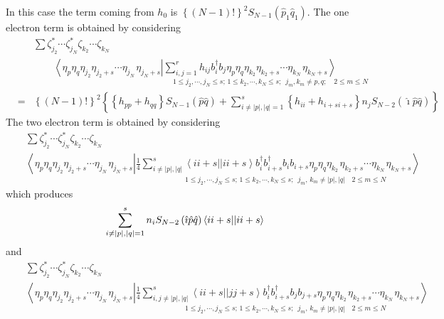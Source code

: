 In this case the term coming from $h_{0}$ is $\left\{ \left( N-1\right)
!\right\} ^{2}S_{N-1}\left( \hat{p}_{1}\hat{q}_{1}\right) $. The one
electron term is obtained by considering 
\begin{eqnarray}
&&\sum \zeta _{j_{2}}^{\ast }\cdots \zeta _{j_{N}}^{\ast }\zeta
_{k_{2}}\cdots \zeta _{k_{N}}  \nonumber \\
&&\qquad \left\langle \eta _{p}\eta _{q}\eta _{j_{2}}\eta _{j_{2}+s}\cdots
\eta _{j_{N}\,}\eta _{j_{N}+s}\left| \sum_{i,j=1}^{r}h_{ij}b_{i}^{\dagger
}b_{j}\eta _{p}\eta _{q}\eta _{k_{2}}\eta _{k_{2}+s}\cdots \eta
_{k_{N}\,}\eta _{k_{N}+s}\right. \right\rangle  \nonumber \\
&&\qquad \qquad \qquad \qquad \qquad \qquad \qquad _{1\leq j_{2},\cdots
,j_{N}\leq s;\,1\leq k_{2},\cdots ,k_{N}\leq s;\,\,\,j_{m},k_{m}\neq
p,q;\quad 2\leq m\leq N}  \nonumber \\
&=&\left\{ \left( N-1\right) !\right\} ^{2}\left\{ \left\{
h_{pp}+h_{qq}\right\} S_{N-1}\left( \hat{p}\hat{q}\right) +\sum_{i\neq
\left| p\right| ,\left| q\right| =1}^{s}\left\{ h_{ii}+h_{i+si+s}\right\}
n_{j}S_{N-2}\left( \hat{\imath}\hat{p}\hat{q}\right) \right\}
\end{eqnarray}%
The two electron term is obtained by considering 
\begin{eqnarray}
&&\sum \zeta _{j_{2}}^{\ast }\cdots \zeta _{j_{N}}^{\ast }\zeta
_{k_{2}}\cdots \zeta _{k_{N}}  \nonumber \\
&&\left\langle \eta _{p}\eta _{q}\eta _{j_{2}}\eta _{j_{2}+s}\cdots \eta
_{j_{N}\,}\eta _{j_{N}+s}\left| \frac{1}{4}\sum_{i\neq \left| p\right|
,\left| q\right| }^{s}\left\langle ii+s||ii+s\right\rangle b_{i}^{\dagger
}b_{i+s}^{\dagger }b_{i}b_{i+s}\eta _{p}\eta _{q}\eta _{k_{2}\,}\eta
_{k_{2}+s}\cdots \eta _{k_{N}\,}\eta _{k_{N}+s}\right. \right\rangle 
\nonumber \\
&&\qquad \qquad \qquad \qquad \qquad \qquad \qquad \qquad _{1\leq
j_{2},\cdots ,j_{N}\leq s;\,1\leq k_{2},\cdots ,k_{N}\leq
s;\,\,\,j_{m},\,k_{m}\neq \left| p\right| ,\left| q\right| \quad 2\leq m\leq
N}
\end{eqnarray}%
which produces 
\begin{equation}
\sum_{i\neq \left| p\right| ,\left| q\right| =1}^{s}n_{i}S_{N-2}\left( \hat{%
\imath}\hat{p}\hat{q}\right) \left\langle ii+s||ii+s\right\rangle
\end{equation}%
and 
\begin{eqnarray}
&&\sum \zeta _{j_{2}}^{\ast }\cdots \zeta _{j_{N}}^{\ast }\zeta
_{k_{2}}\cdots \zeta _{k_{N}}  \nonumber \\
&&\left\langle \eta _{p}\eta _{q}\eta _{j_{2}}\eta _{j_{2}+s}\cdots \eta
_{j_{N}\,}\eta _{j_{N}+s}\left| \frac{1}{4}\sum_{i,j\neq \left| p\right|
,\left| q\right| }^{s}\left\langle ii+s||jj+s\right\rangle b_{i}^{\dagger
}b_{i+s}^{\dagger }b_{j}b_{j+s}\eta _{p}\eta _{q}\eta _{k_{2}\,}\eta
_{k_{2}+s}\cdots \eta _{k_{N}\,}\eta _{k_{N}+s}\right. \right\rangle 
\nonumber \\
&&\qquad \qquad \qquad \qquad \qquad \qquad \qquad \qquad _{1\leq
j_{2},\cdots ,j_{N}\leq s;\,1\leq k_{2},\cdots ,k_{N}\leq
s;\,\,\,j_{m},\,k_{m}\neq \left| p\right| ,\left| q\right| \quad 2\leq m\leq
N}
\end{eqnarray}%
